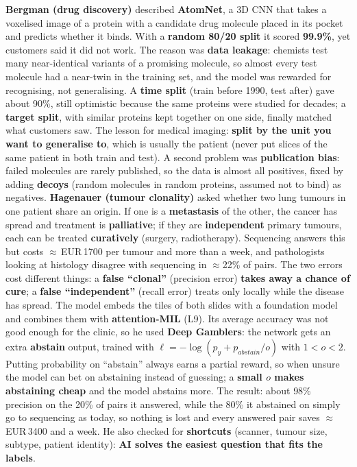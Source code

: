 \documentclass[a4paper]{article}
\newcommand{\K}[1]{\textcolor{kg}{\textbf{#1}}}
\newcommand{\F}[1]{\textcolor{fb}{#1}}
\newcommand{\E}[1]{\textcolor{ep}{#1}}
\newcommand{\T}[1]{\textcolor{tr}{\textbf{#1}}}
\begin{document}
\textbf{Bergman (drug discovery)} described \K{AtomNet}, a 3D CNN that takes a voxelised image of a protein with a candidate drug molecule placed in its pocket and predicts whether it binds. With a \T{random 80/20 split} it scored \T{99.9\%}, yet customers said it did not work. The reason was \K{data leakage}: chemists test many near-identical variants of a promising molecule, so almost every test molecule had a near-twin in the training set, and the model was rewarded for recognising, not generalising. A \K{time split} (train before 1990, test after) gave about 90\%, still optimistic because the same proteins were studied for decades; a \K{target split}, with similar proteins kept together on one side, finally matched what customers saw. The lesson for medical imaging: \K{split by the unit you want to generalise to}, which is usually the \E{patient} (never put slices of the same patient in both train and test). A second problem was \K{publication bias}: failed molecules are rarely published, so the data is almost all positives, fixed by adding \K{decoys} (random molecules in random proteins, assumed not to bind) as negatives.
\textbf{Hagenauer (tumour clonality)} asked whether two lung tumours in one patient share an origin. If one is a \K{metastasis} of the other, the cancer has spread and treatment is \K{palliative}; if they are \K{independent} primary tumours, each can be treated \K{curatively} (surgery, radiotherapy). Sequencing answers this but costs \E{$\approx$\,EUR\,1700 per tumour and more than a week}, and pathologists looking at histology disagree with sequencing in \E{$\approx$22\%} of pairs. The two errors cost different things: a \K{false ``clonal''} (precision error) \T{takes away a chance of cure}; a \K{false ``independent''} (recall error) treats only locally while the disease has spread. The model embeds the tiles of both slides with a foundation model and combines them with \K{attention-MIL} (L9). Its average accuracy was not good enough for the clinic, so he used \K{Deep Gamblers}: the network gets an extra \K{abstain} output, trained with \F{$\ell=-\log(p_y+p_{abstain}/o)$} with $1<o<2$. Putting probability on ``abstain'' always earns a partial reward, so when unsure the model can bet on abstaining instead of guessing; a \K{small $o$ makes abstaining cheap} and the model abstains more. The result: about \E{98\% precision on the 20\% of pairs it answered}, while the 80\% it abstained on simply go to sequencing as today, so nothing is lost and every answered pair saves \E{$\approx$\,EUR\,3400 and a week}. He also checked for \K{shortcuts} (scanner, tumour size, subtype, patient identity): \T{AI solves the easiest question that fits the labels}.
\end{document}
